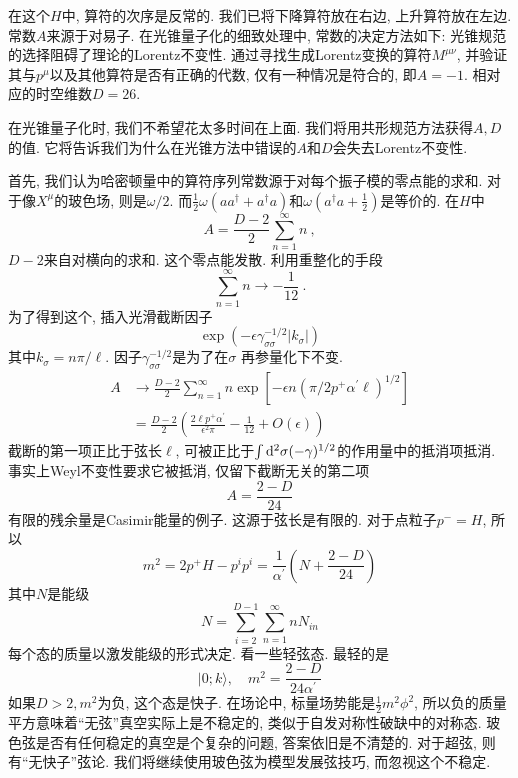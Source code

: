 \noindent 在这个$H$中, 算符的次序是反常的. 我们已将下降算符放在右边, 上升算符放在左边. 常数$A$来源于对易子. 在光锥量子化的细致处理中, 常数的决定方法如下: 光锥规范的选择阻碍了理论的Lorentz不变性. 通过寻找生成Lorentz变换的算符$M^{\mu\nu}$, 并验证其与$p^\mu$以及其他算符是否有正确的代数, 仅有一种情况是符合的, 即$A=-1$. 相对应的时空维数$D=26$.

在光锥量子化时, 我们不希望花太多时间在上面. 我们将用共形规范方法获得$A,D$的值. 它将告诉我们为什么在光锥方法中错误的$A$和$D$会失去Lorentz不变性. 

首先, 我们认为哈密顿量中的算符序列常数源于对每个振子模的零点能的求和. 
对于像$X^\mu$的玻色场,  则是$\omega/2$. 而$\frac{1}{2} \omega\left(a a^{\dagger}+a^{\dagger} a\right)$和$\omega\left(a^{\dagger} a+\frac{1}{2}\right)$是等价的. 在$H$中
\begin{equation}
A=\frac{D-2}{2} \sum_{n=1}^{\infty} n \:, \label{1.3.31}
\end{equation}
$D-2$来自对横向的求和. 这个零点能发散. 利用重整化的手段
\begin{equation}
\sum_{n=1}^{\infty} n \rightarrow-\frac{1}{12} \:. \label{1.3.32}
\end{equation}
为了得到这个, 插入光滑截断因子
\begin{equation}
\exp (-\epsilon \gamma_{\sigma \sigma}^{-1 / 2}|k_{\sigma}|) \label{1.3.33}
\end{equation}
其中$k_\sigma=n\pi/\ell$. 因子$\gamma_{\sigma\sigma}^{-1/2}$是为了在$\sigma$ 再参量化下不变. 
\begin{equation}
\begin{aligned}
A & \rightarrow \frac{D-2}{2} \sum_{n=1}^{\infty} n \exp \left[-\epsilon n\left(\pi / 2 p^{+} \alpha^{\prime} \ell\right)^{1 / 2}\right] \\
&=\frac{D-2}{2}\left(\frac{2 \ell p^{+} \alpha^{\prime}}{\epsilon^{2} \pi}-\frac{1}{12}+O(\epsilon)\right)
\end{aligned}
\end{equation}
截断的第一项正比于弦长$\ell$, 可被正比于$\int \mathrm{d}^2\sigma(-\gamma)^{1/2}$的作用量中的抵消项抵消. 事实上Weyl不变性要求它被抵消, 仅留下截断无关的第二项
\begin{equation}
A=\frac{2-D}{24}
\end{equation}
有限的残余量是Casimir能量的例子. 这源于弦长是有限的. 对于点粒子$p^-=H$, 所以
\begin{equation}
m^{2}=2 p^{+} H-p^{i} p^{i}=\frac{1}{\alpha^{\prime}}\left(N+\frac{2-D}{24}\right)
\end{equation}
其中$N$是能级
\begin{equation}
N=\sum_{i=2}^{D-1} \sum_{n=1}^{\infty} n N_{i n}
\end{equation}
每个态的质量以激发能级的形式决定. 
看一些轻弦态. 最轻的是
\begin{equation}
|0 ; k\rangle, \quad m^{2}=\frac{2-D}{24 \alpha^{\prime}}
\end{equation}
如果$D>2,m^2$为负, 这个态是快子. 在场论中, 标量场势能是$\frac{1}{2}m^2\phi^2$, 所以负的质量平方意味着``无弦''真空实际上是不稳定的, 类似于自发对称性破缺中的对称态. 玻色弦是否有任何稳定的真空是个复杂的问题, 答案依旧是不清楚的. 对于超弦, 则有``无快子''弦论. 我们将继续使用玻色弦为模型发展弦技巧, 而忽视这个不稳定. 

